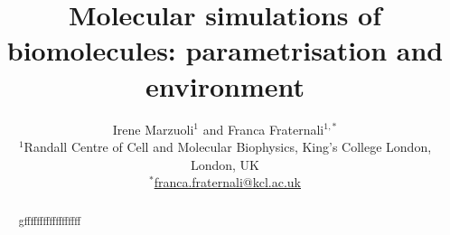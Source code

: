 \documentclass[11pt]{article}
\title{\onehalfspacing \textbf{Molecular simulations of biomolecules: parametrisation and environment}}
\author{\onehalfspacing
Irene Marzuoli$^{1}$ and Franca Fraternali$^{1,*}$\\
\medskip
\small $^{1}$Randall Centre of Cell and Molecular Biophysics, King's College London, London, UK\\
\small \underline{$^{*}$franca.fraternali@kcl.ac.uk}
}
\date{}
\begin{document}
\maketitle

\begin{abstract}
gffffffffffffffffff
\end{abstract}



\clearpage



\printbibliography
\end{document}
